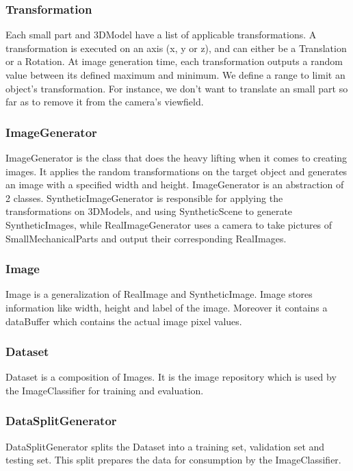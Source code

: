 \subsubsection{Transformation}
Each small part and 3DModel have a list of applicable transformations. A transformation is executed on an axis (x, y or z), and can either be a Translation or a Rotation.
At image generation time, each transformation outputs a random value between its defined maximum and minimum. We define a range to limit an object's transformation. For instance, we don't want to translate an small part so far as to remove it from the camera's viewfield.

\subsubsection{ImageGenerator}
ImageGenerator is the class that does the heavy lifting when it comes to creating images. It applies the random transformations on the target object and generates an image with a specified width and height.
ImageGenerator is an abstraction of 2 classes. SyntheticImageGenerator is responsible for applying the transformations on 3DModels, and using SyntheticScene to generate SyntheticImages, while RealImageGenerator uses a camera to take pictures of SmallMechanicalParts and output their corresponding RealImages.

\subsubsection{Image}
Image is a generalization of RealImage and SyntheticImage. Image stores information like width, height and label of the image. Moreover it contains a dataBuffer which contains the actual image pixel values.

\subsubsection{Dataset}
Dataset is a composition of Images. It is the image repository which is used by the ImageClassifier for training and evaluation.

\subsubsection{DataSplitGenerator}
DataSplitGenerator splits the Dataset into a training set, validation set and testing set. This split prepares the data for consumption by the ImageClassifier.

